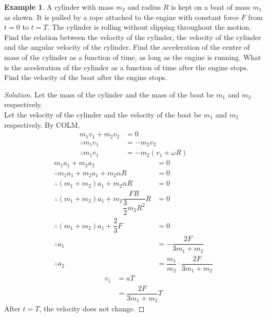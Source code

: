 \documentclass[fleqn, a4paper, 12pt]{article}
\theoremstyle{definition}
\newtheorem{example}{Example}
\theoremstyle{theorem}
\newenvironment{solution}
{\begin{proof}[Solution]\let\qed\relax}
	{\end{proof}}
\begin{document}
\begin{example}
	A cylinder with mass $m_2$ and radius $R$ is kept on a boat of mass $m_1$ as shown. It is pulled by a rope attached to the engine with constant force $F$ from $t = 0$ to $t = T$. The cylinder is rolling without slipping throughout the motion. Find the relation between the velocity of the cylinder, the velocity of the cylinder and the angular velocity of the cylinder. Find the acceleration of the centre of mass of the cylinder as a function of time, as long as the engine is running. What is the acceleration of the cylinder as a function of time after the engine stops. Find the velocity of the boat after the engine stops.\\
\end{example}

\begin{solution}
	Let the mass of the cylinder and the mass of the boat be $m_1$ and $m_2$ respectively.\\
	Let the velocity of the cylinder and the velocity of the boat be $m_1$ and $m_2$ respectively.
	By COLM,
	\begin{align*}
		m_1 v_1 + m_2 v_2 &= 0\\
		\therefore m_1 v_1 &= - m_2 v_2\\
		\therefore m_1 v_1 &= - m_2 (v_1 + \omega R)
	\end{align*}
	\begin{align*}
		m_1 a_1 + m_2 a_2 &= 0\\
		\therefore m_1 a_1 + m_2 a_1 + m_2 \alpha R &= 0\\
		\therefore (m_1 + m_2) a_1 + m_2 \alpha R &= 0\\
		\therefore (m_1 + m_2) a_1 + m_2 \dfrac{F R}{\dfrac{3}{2} m_2 R^2} R &= 0\\
		\therefore (m_1 + m_2) a_1 + \dfrac{2}{3} F &= 0\\
		\therefore a_1 &= -\dfrac{2F}{3m_1 + m_2}\\
		\therefore a_2 &= \dfrac{m_1}{m_2} \cdot \dfrac{2F}{3m_1 + m_2}
	\end{align*}
	\begin{align*}
		v_1 &= a T\\
		&= \dfrac{2F}{3m_1 + m_2} T
	\end{align*}
	After $t = T$, the velocity does not change.
\end{solution}
\end{document}
